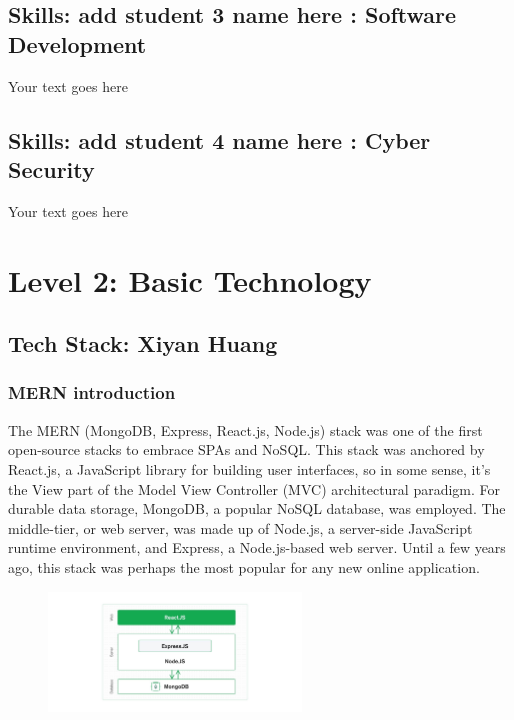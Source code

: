 \documentclass[a4paper, 11pt]{report}
\begin{document}

\newpage
\subsection{Skills: add student 3 name here : Software Development}

Your text goes here


\newpage
\subsection{Skills: add student 4 name here : Cyber Security}

Your text goes here



\newpage
\section{Level 2: Basic Technology}

\subsection{Tech Stack: Xiyan Huang}

\subsubsection{MERN introduction}
The MERN (MongoDB, Express, React.js, Node.js) stack was one of the first open-source stacks to embrace SPAs and NoSQL. This stack was anchored by React.js, a JavaScript library for building user interfaces, so in some sense, it’s the View part of the Model View Controller (MVC) architectural paradigm. For durable data storage, MongoDB, a popular NoSQL database, was employed. The middle-tier, or web server, was made up of Node.js, a server-side JavaScript runtime environment, and Express, a Node.js-based web server. Until a few years ago, this stack was perhaps the most popular for any new online application.\cite{(Vasan Subramanian, 2019)}\\

 \begin{figure}[t]
   \caption{\cite{(MongoDB, n.d.)}}
      \centering
      \includegraphics[width=0.6\textwidth]{MERN}
   \end{figure}
\end{document}
